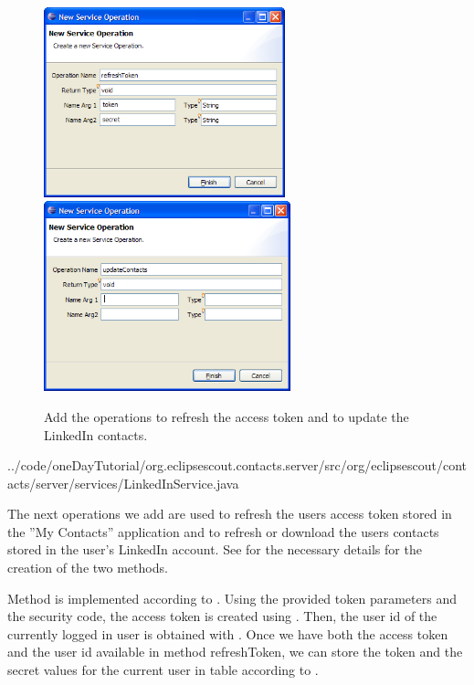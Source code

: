 \documentclass[a4paper,10pt,twoside]{book}
\begin{document}
\begin{figure}
\includegraphics[height=5.5cm]{new_operation_refreshtoken.png} \hspace{5mm}
\includegraphics[height=5.5cm]{new_operation_updatecontacts.png}
\caption{Add the operations to refresh the access token and to update the LinkedIn contacts.}
\end{figure}


{../code/oneDayTutorial/org.eclipsescout.contacts.server/src/org/eclipsescout/contacts/server/services/LinkedInService.java}

The next operations we add are used to refresh the users access token stored in the ''My Contacts'' application and to refresh or download the users contacts stored in the user's LinkedIn account. 
See  for the necessary details for the creation of the two methods. 

Method  is implemented according to . 
Using the provided token parameters and the security code, the access token is created using . 
Then, the user id of the currently logged in user is obtained with . 
Once we have both the access token and the user id available in method {refreshToken}, we can store the token and the secret values for the current user in table  according to .
\end{document}
